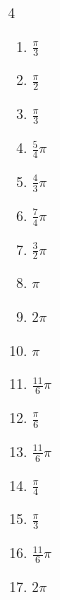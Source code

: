\begin{multicols}{4}
\begin{enumerate}
  \item $\displaystyle \frac{\pi}{3}$

  \item $\displaystyle \frac{\pi}{2}$

  \item $\displaystyle \frac{\pi}{3}$

  \item $\displaystyle \frac{5}{4}\pi$

  \item $\displaystyle \frac{4}{3}\pi$

  \item $\displaystyle \frac{7}{4}\pi$

  \item $\displaystyle \frac{3}{2}\pi$

  \item $\displaystyle \pi$

  \item $\displaystyle 2\pi$

  \item $\displaystyle \pi$

  \item $\displaystyle \frac{11}{6}\pi$

  \item $\displaystyle \frac{\pi}{6}$

  \item $\displaystyle \frac{11}{6}\pi$

  \item $\displaystyle \frac{\pi}{4}$

  \item $\displaystyle \frac{\pi}{3}$

  \item $\displaystyle \frac{11}{6}\pi$

  \item $\displaystyle 2\pi$

\end{enumerate}
\end{multicols}

